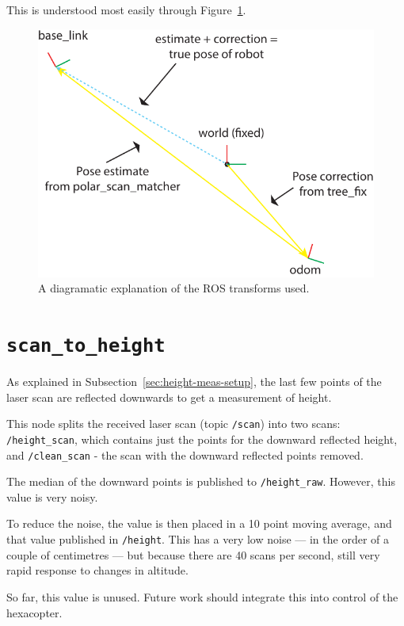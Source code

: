 \documentclass[12pt,oneside,a4paper,draft]{book}
\begin{document}
This is understood most easily through Figure~\ref{fig:rostf}.

\begin{figure}[h!]
  \centering
  \includegraphics[width=\textwidth]{figs/rostf}
  \caption{A diagramatic explanation of the ROS transforms used.}
  \label{fig:rostf}
\end{figure}

\newpage
\section{\texttt{scan\_to\_height}}
\label{sec:scan_to_height}

As explained in Subsection~\ref{sec:height-meas-setup}, the last few
points of the laser scan are reflected downwards to get a measurement
of height.

This node splits the received laser scan (topic \texttt{/scan}) into
two scans: \texttt{/height\_scan}, which contains just the points for
the downward reflected height, and \texttt{/clean\_scan} - the scan
with the downward reflected points removed.

The median of the downward points is published to
\texttt{/height\_raw}. However, this value is very noisy.

To reduce the noise, the value is then placed in a 10 point moving
average, and that value published in \texttt{/height}. This has a very
low noise --- in the order of a couple of centimetres --- but because
there are 40 scans per second, still very rapid response to changes in
altitude.

So far, this value is unused. Future work should integrate this into
control of the hexacopter.
\end{document}
